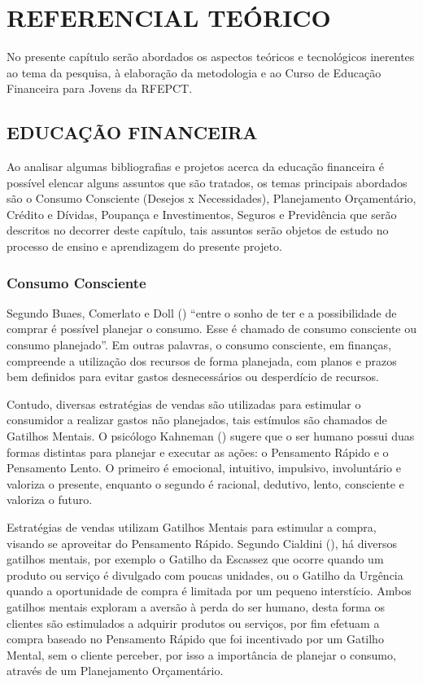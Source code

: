 \chapter{REFERENCIAL TEÓRICO}
No presente capítulo serão abordados os aspectos teóricos e tecnológicos inerentes ao tema da pesquisa, à elaboração da metodologia e ao Curso de Educação Financeira para Jovens da RFEPCT.

\section{EDUCAÇÃO FINANCEIRA}
Ao analisar algumas bibliografias e projetos acerca da educação financeira é possível elencar alguns assuntos que são tratados, os temas principais abordados são o Consumo Consciente (Desejos x Necessidades), Planejamento Orçamentário, Crédito e Dívidas, Poupança e Investimentos, Seguros e Previdência que serão descritos no decorrer deste capítulo, tais assuntos serão objetos de estudo no processo de ensino e aprendizagem do presente projeto.

\subsection{Consumo Consciente}
Segundo Buaes, Comerlato e Doll (\citeyear{buaes2015}) “entre o sonho de ter e a possibilidade de comprar é possível planejar o consumo. Esse é chamado de consumo consciente ou consumo planejado”. Em outras palavras, o consumo consciente, em finanças, compreende a utilização dos recursos de forma planejada, com planos e prazos bem definidos para evitar gastos desnecessários ou desperdício de recursos.

Contudo, diversas estratégias de vendas são utilizadas para estimular o consumidor a realizar gastos não planejados, tais estímulos são chamados de Gatilhos Mentais. O psicólogo Kahneman (\citeyear{kahneman2012}) sugere que o ser humano possui duas formas distintas para planejar e executar as ações: o Pensamento Rápido e o Pensamento Lento. O primeiro é emocional, intuitivo, impulsivo, involuntário e valoriza o presente, enquanto o segundo é racional, dedutivo, lento, consciente e valoriza o futuro.

Estratégias de vendas utilizam Gatilhos Mentais para estimular a compra, visando se aproveitar do Pensamento Rápido. Segundo Cialdini (\citeyear{cialdini2012}), há diversos gatilhos mentais, por exemplo o Gatilho da Escassez que ocorre quando um produto ou serviço é divulgado com poucas unidades, ou o Gatilho da Urgência quando a oportunidade de compra é limitada por um pequeno interstício. Ambos gatilhos mentais  exploram a aversão à perda do ser humano, desta forma os clientes são estimulados a adquirir produtos ou serviços, por fim efetuam a compra baseado no Pensamento Rápido que foi incentivado por um Gatilho Mental, sem o cliente perceber, por isso a importância de planejar o consumo, através de um Planejamento Orçamentário.

